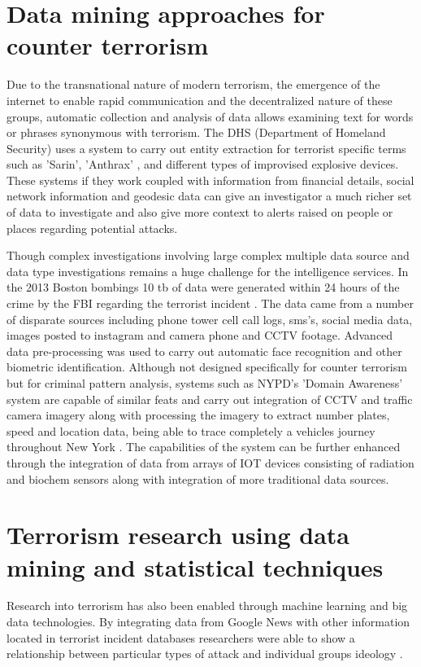 \section{Data mining approaches for counter terrorism}

Due to the transnational nature of  modern terrorism, the emergence of the internet to enable rapid communication and the decentralized nature of these groups, automatic collection and analysis of data allows examining text for words or phrases synonymous with terrorism.  The DHS (Department of Homeland Security) uses a system to carry out entity extraction for terrorist specific terms such as 'Sarin', 'Anthrax' \citep{merrick2015outthinking}, and different types of improvised explosive devices. These systems if they work coupled with information from financial details, social network information and geodesic data can give an investigator a much richer set of data to investigate and also give more context to alerts raised on people or places regarding potential attacks. 

Though complex investigations involving large complex multiple data source and data type investigations remains a huge challenge for the intelligence services. In the 2013 Boston bombings 10 tb of data were generated within 24 hours of the crime by the FBI regarding the terrorist incident \citep{jeberson2015survey}. The data came from a number of disparate sources including phone tower cell call logs, sms's, social media data, images posted to instagram and camera phone and CCTV footage. Advanced data pre-processing was used to carry out automatic face recognition and other biometric identification. Although not designed specifically for counter terrorism but for criminal pattern analysis, systems such as NYPD's 'Domain Awareness' system are capable of similar feats and carry out integration of CCTV and traffic camera imagery along with processing the imagery to extract number plates, speed and location data, being able to trace completely a vehicles journey throughout New York \citep{coscarelli2012nypd}. The capabilities of the system can be further enhanced through the integration of data from arrays of IOT devices consisting of radiation and biochem sensors along with integration of more traditional data sources.

\section{Terrorism research using data mining and statistical techniques}
Research into terrorism has also been enabled through machine learning and big data technologies. By integrating data from Google News with other information located in terrorist incident databases researchers were able to show a relationship between particular types of attack and individual groups ideology \citep{strang2015analyzing}.

